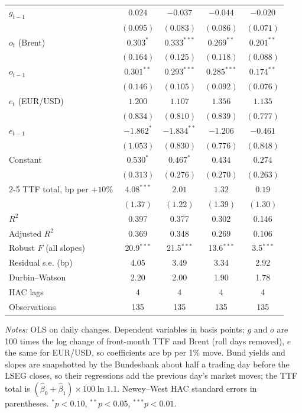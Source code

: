 \documentclass[11pt,a4paper]{article}
\begin{document}
\begin{table}[htbp]
\begin{tabular}{@{}l*{4}{c}@{}}
$g_{t-1}$ & $0.024$ & $-0.037$ & $-0.044$ & $-0.020$\\
 & $(0.095)$ & $(0.083)$ & $(0.086)$ & $(0.071)$\\
$o_t$ (Brent) & $0.303^{*}$ & $0.333^{***}$ & $0.269^{**}$ & $0.201^{**}$\\
 & $(0.164)$ & $(0.125)$ & $(0.118)$ & $(0.088)$\\
$o_{t-1}$ & $0.301^{**}$ & $0.293^{***}$ & $0.285^{***}$ & $0.174^{**}$\\
 & $(0.146)$ & $(0.105)$ & $(0.092)$ & $(0.076)$\\
$e_t$ (EUR/USD) & $1.200$ & $1.107$ & $1.356$ & $1.135$\\
 & $(0.834)$ & $(0.810)$ & $(0.839)$ & $(0.777)$\\
$e_{t-1}$ & $-1.862^{*}$ & $-1.834^{**}$ & $-1.206$ & $-0.461$\\
 & $(1.053)$ & $(0.830)$ & $(0.776)$ & $(0.848)$\\
Constant & $0.530^{*}$ & $0.467^{*}$ & $0.434$ & $0.274$\\
 & $(0.313)$ & $(0.276)$ & $(0.270)$ & $(0.263)$\\
\cmidrule(l){2-5}
TTF total, bp per $+10\%$ & $4.08^{***}$ & $2.01$ & $1.32$ & $0.19$\\
 & $(1.37)$ & $(1.22)$ & $(1.39)$ & $(1.30)$\\
$R^2$ & 0.397 & 0.377 & 0.302 & 0.146\\
Adjusted $R^2$ & 0.369 & 0.348 & 0.269 & 0.106\\
Robust $F$ (all slopes) & 20.9$^{***}$ & 21.5$^{***}$ & 13.6$^{***}$ & 3.5$^{***}$\\
Residual s.e. (bp) & 4.05 & 3.49 & 3.34 & 2.92\\
Durbin--Watson & 2.20 & 2.00 & 1.90 & 1.78\\
HAC lags & 4 & 4 & 4 & 4\\
Observations & 135 & 135 & 135 & 135\\
\bottomrule
\end{tabular}
\par\vspace{4pt}\begin{minipage}{0.94\textwidth}\scriptsize\textit{Notes:} OLS on daily changes. Dependent variables in basis points; $g$ and $o$ are 100 times the log change of front-month TTF and Brent (roll days removed), $e$ the same for EUR/USD, so coefficients are bp per 1\% move. Bund yields and slopes are snapshotted by the Bundesbank about half a trading day before the LSEG closes, so their regressions add the previous day's market moves; the TTF total is $(\hat\beta_0+\hat\beta_1)\times 100\ln 1.1$. Newey--West HAC standard errors in parentheses. $^{*}p<0.10$, $^{**}p<0.05$, $^{***}p<0.01$.\end{minipage}
\end{table}
\end{document}
